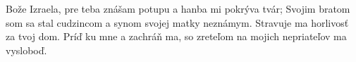 Bože Izraela, pre teba znášam potupu a hanba mi pokrýva tvár;
Svojim bratom som sa stal cudzincom
a synom svojej matky neznámym.
\versseparator
Stravuje ma horlivosť za tvoj dom.
\versseparator
Príď ku mne a zachráň ma,
so zreteľom na mojich nepriateľov ma vysloboď.